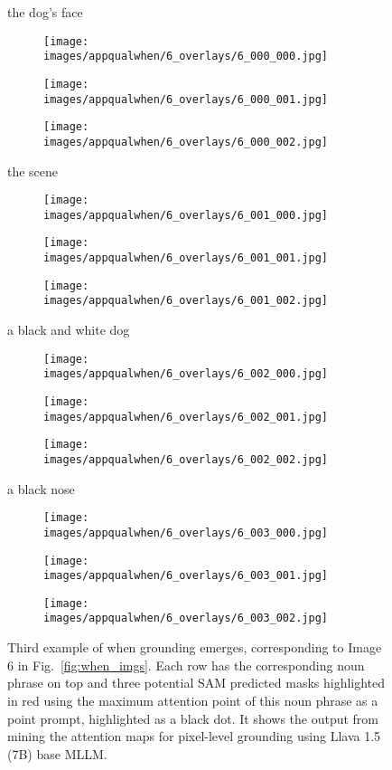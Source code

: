 \begin{figure}[t]
\centering
the dog's face
\begin{subfigure}{0.16\textwidth}
\texttt{[image: images/appqualwhen/6\_overlays/6\_000\_000.jpg]}
\end{subfigure}%
\begin{subfigure}{0.16\textwidth}
\texttt{[image: images/appqualwhen/6\_overlays/6\_000\_001.jpg]}
\end{subfigure}%
\begin{subfigure}{0.16\textwidth}
\texttt{[image: images/appqualwhen/6\_overlays/6\_000\_002.jpg]}
\end{subfigure}

the scene
\begin{subfigure}{0.16\textwidth}
\texttt{[image: images/appqualwhen/6\_overlays/6\_001\_000.jpg]}
\end{subfigure}%
\begin{subfigure}{0.16\textwidth}
\texttt{[image: images/appqualwhen/6\_overlays/6\_001\_001.jpg]}
\end{subfigure}%
\begin{subfigure}{0.16\textwidth}
\texttt{[image: images/appqualwhen/6\_overlays/6\_001\_002.jpg]}
\end{subfigure}

a black and white dog
\begin{subfigure}{0.16\textwidth}
\texttt{[image: images/appqualwhen/6\_overlays/6\_002\_000.jpg]}
\end{subfigure}%
\begin{subfigure}{0.16\textwidth}
\texttt{[image: images/appqualwhen/6\_overlays/6\_002\_001.jpg]}
\end{subfigure}%
\begin{subfigure}{0.16\textwidth}
\texttt{[image: images/appqualwhen/6\_overlays/6\_002\_002.jpg]}
\end{subfigure}

a black nose
\begin{subfigure}{0.16\textwidth}
\texttt{[image: images/appqualwhen/6\_overlays/6\_003\_000.jpg]}
\end{subfigure}%
\begin{subfigure}{0.16\textwidth}
\texttt{[image: images/appqualwhen/6\_overlays/6\_003\_001.jpg]}
\end{subfigure}%
\begin{subfigure}{0.16\textwidth}
\texttt{[image: images/appqualwhen/6\_overlays/6\_003\_002.jpg]}
\end{subfigure}
\caption{Third example of when grounding emerges, corresponding to Image 6 in Fig.~\ref{fig:when_imgs}. Each row has the corresponding noun phrase on top and three potential SAM predicted masks highlighted in red using the maximum attention point of this noun phrase as a point prompt, highlighted as a black dot. It shows the output from mining the attention maps for pixel-level grounding using Llava 1.5 (7B) base MLLM.}
\label{fig:when3}
\end{figure}

